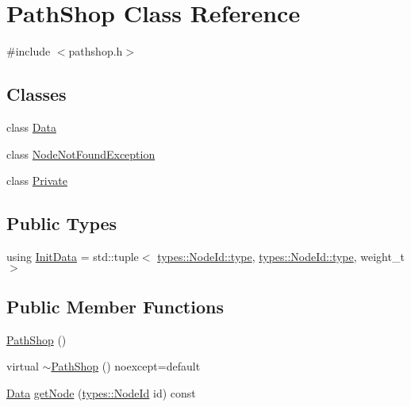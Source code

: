 \hypertarget{class_path_shop}{}\section{Path\+Shop Class Reference}
\label{class_path_shop}


{\ttfamily \#include $<$pathshop.\+h$>$}

\subsection*{Classes}
\begin{DoxyCompactItemize}
\item 
class \mbox{\hyperlink{class_path_shop_1_1_data}{Data}}
\item 
class \mbox{\hyperlink{class_path_shop_1_1_node_not_found_exception}{Node\+Not\+Found\+Exception}}
\item 
class \mbox{\hyperlink{class_path_shop_1_1_private}{Private}}
\end{DoxyCompactItemize}
\subsection*{Public Types}
\begin{DoxyCompactItemize}
\item 
using \mbox{\hyperlink{class_path_shop_a5b4a6b28d09367509e218e48128dbf11}{Init\+Data}} = std\+::tuple$<$ \mbox{\hyperlink{classtypes_1_1_id_a3460149759853c50fa31ad199e73419a}{types\+::\+Node\+Id\+::type}}, \mbox{\hyperlink{classtypes_1_1_id_a3460149759853c50fa31ad199e73419a}{types\+::\+Node\+Id\+::type}}, weight\+\_\+t $>$
\end{DoxyCompactItemize}
\subsection*{Public Member Functions}
\begin{DoxyCompactItemize}
\item 
\mbox{\hyperlink{class_path_shop_a3272ce71ec3fe02ff46dc3e4c5feef09}{Path\+Shop}} ()
\item 
virtual \mbox{\hyperlink{class_path_shop_a36746d15228405130e85b5125e15508f}{$\sim$\+Path\+Shop}} () noexcept=default
\item 
\mbox{\hyperlink{class_path_shop_1_1_data}{Data}} \mbox{\hyperlink{class_path_shop_a7378ad4eed020bb21213957f2bdddc82}{get\+Node}} (\mbox{\hyperlink{classtypes_1_1_node_id}{types\+::\+Node\+Id}} id) const
\end{DoxyCompactItemize}
